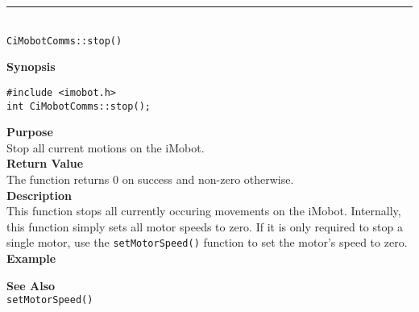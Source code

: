 \noindent
\vspace{5pt}
\rule{4.5in}{0.015in}\\
\noindent
{\LARGE \texttt{CiMobotComms::stop()}}\\
{}

\noindent
{\bf Synopsis}\\
\begin{verbatim}
#include <imobot.h>
int CiMobotComms::stop();
\end{verbatim}

\noindent
{\bf Purpose}\\
Stop all current motions on the iMobot.\\

\noindent
{\bf Return Value}\\
The function returns 0 on success and non-zero otherwise.\\

\noindent
{\bf Description}\\
This function stops all currently occuring movements on the iMobot. Internally, this function simply sets all motor speeds to zero. If it is only required to stop a single motor, use the 
\texttt{setMotorSpeed()} function to set the motor's speed to zero. \\

\noindent
{\bf Example}\\
\noindent

\noindent
{\bf See Also}\\
\texttt{setMotorSpeed()}


